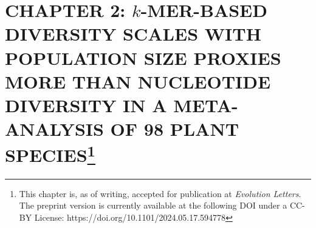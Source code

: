 \documentclass[12pt]{article}
\begin{document}
\newpage

\section*{CHAPTER 2: $k$-MER-BASED DIVERSITY SCALES WITH POPULATION SIZE PROXIES MORE THAN NUCLEOTIDE DIVERSITY IN A META-ANALYSIS OF 98 PLANT SPECIES\footnote{This chapter is, as of writing, accepted for publication at \textit{Evolution Letters}. The preprint version is currently available at the following DOI under a CC-BY License: https://doi.org/10.1101/2024.05.17.594778}}

\setcounter{figure}{0}
\renewcommand{\figurename}{Figure}
\renewcommand{\thefigure}{2.\arabic{figure}}

\setcounter{equation}{0}
\renewcommand{\theequation}{2.\arabic{equation}}
\end{document}
